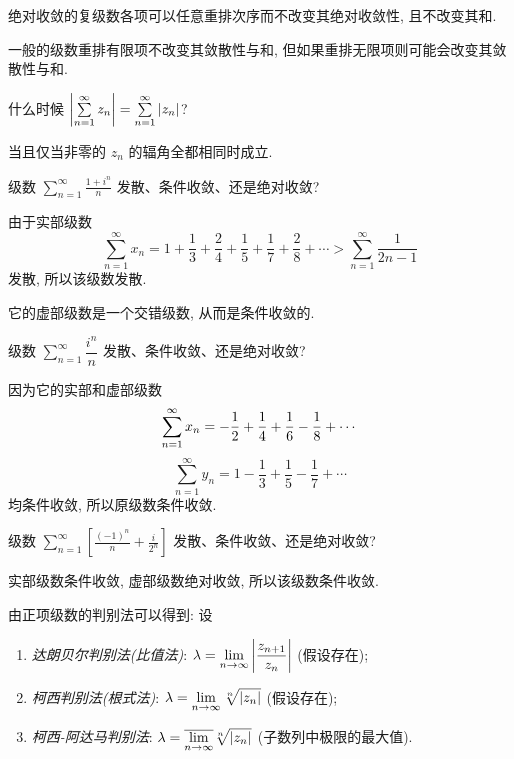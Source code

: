 绝对收敛的复级数各项可以任意重排次序而不改变其绝对收敛性, 且不改变其和.

一般的级数重排有限项不改变其敛散性与和, 但如果重排无限项则可能会改变其敛散性与和.

\begin{thinking}
	什么时候 $\left|\sum\limits_{n=1}^\infty z_n\right|=\sum\limits_{n=1}^\infty|z_n|$?
\end{thinking}

\begin{answer}
	当且仅当非零的 $z_n$ 的辐角全都相同时成立.
\end{answer}

\begin{example}
	级数 $\displaystyle\sum_{n=1}^\infty\frac{1+i^n}n$ 发散、条件收敛、还是绝对收敛?
\end{example}

\begin{solution}
	由于实部级数
	\[\sum_{n=1}^\infty x_n=
	1+\frac13+\frac24+\frac15+\frac17+\frac28+\cdots>\sum_{n=1}^\infty\frac1{2n-1}\]
	发散, 所以该级数发散.
\end{solution}

它的虚部级数是一个交错级数, 从而是条件收敛的.

\begin{example}
	级数 $\displaystyle\sum_{n=1}^\infty\dfrac{i^n}n$ 发散、条件收敛、还是绝对收敛?
\end{example}

\begin{solution}
	因为它的实部和虚部级数
	\[\sum_{n=1}^\infty x_n=-\frac{1}{2} +\frac14+\frac16-\frac18+\cdots\]
{
	\[\sum_{n=1}^\infty y_n=1-\frac13+\frac15-\frac17+\cdots\]
	均条件收敛,
}{所以原级数条件收敛.}
\end{solution}

\begin{exercise}
	级数 $\displaystyle\sum_{n=1}^\infty\left[\frac{(-1)^n}n+\frac i{2^n}\right]$ 发散、条件收敛、还是绝对收敛?
\end{exercise}

\begin{answer}
	实部级数条件收敛, 虚部级数绝对收敛, 所以该级数条件收敛.
\end{answer}

由正项级数的判别法可以得到:
设
\begin{enumerate}
	\item \emph{达朗贝尔判别法(比值法)}: $\lambda=\displaystyle\lim_{n\to\infty}\left|\frac{z_{n+1}}{z_n}\right|$ (假设存在);
	\item \emph{柯西判别法(根式法)}: $\lambda=\displaystyle\lim_{n\to\infty}\sqrt[n]{\left|z_n\right|}$ (假设存在);
	\item \emph{柯西-阿达马判别法}: $\lambda=\displaystyle\overline{\lim_{n\to\infty}}\sqrt[n]{\left|z_n\right|}$ (子数列中极限的最大值).
\end{enumerate}

